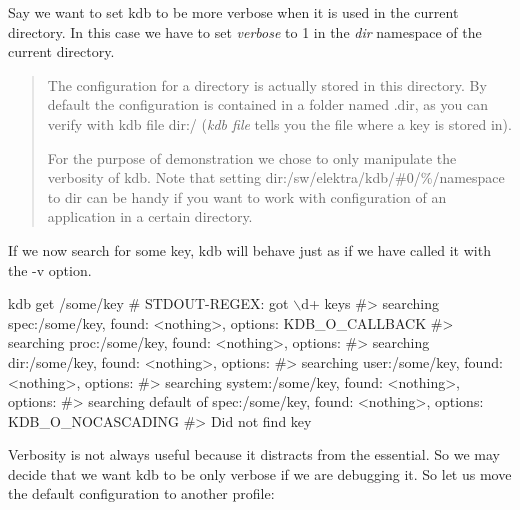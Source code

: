 Say we want to set {\ttfamily kdb} to be more verbose when it is used in the current directory. In this case we have to set {\itshape verbose} to 1 in the {\itshape dir} namespace of the current directory.




\begin{quote}
The configuration for a directory is actually stored in this directory. By default the configuration is contained in a folder named {\ttfamily .dir}, as you can verify with {\ttfamily kdb file dir\+:/} ({\itshape kdb file} tells you the file where a key is stored in).

For the purpose of demonstration we chose to only manipulate the verbosity of kdb. Note that setting {\ttfamily dir\+:/sw/elektra/kdb/\#0/\%/namespace} to {\ttfamily dir} can be handy if you want to work with configuration of an application in a certain directory. \end{quote}


If we now search for some key, {\ttfamily kdb} will behave just as if we have called it with the {\ttfamily -\/v} option.


\begin{DoxyCode}
kdb get /some/key
# STDOUT-REGEX: got \(\backslash\)d+ keys
#> searching spec:/some/key, found: <nothing>, options: KDB\_O\_CALLBACK
#>     searching proc:/some/key, found: <nothing>, options:
#>     searching dir:/some/key, found: <nothing>, options:
#>     searching user:/some/key, found: <nothing>, options:
#>     searching system:/some/key, found: <nothing>, options:
#>     searching default of spec:/some/key, found: <nothing>, options: KDB\_O\_NOCASCADING
#> Did not find key
\end{DoxyCode}


Verbosity is not always useful because it distracts from the essential. So we may decide that we want {\ttfamily kdb} to be only verbose if we are debugging it. So let us move the default configuration to another profile\+:




